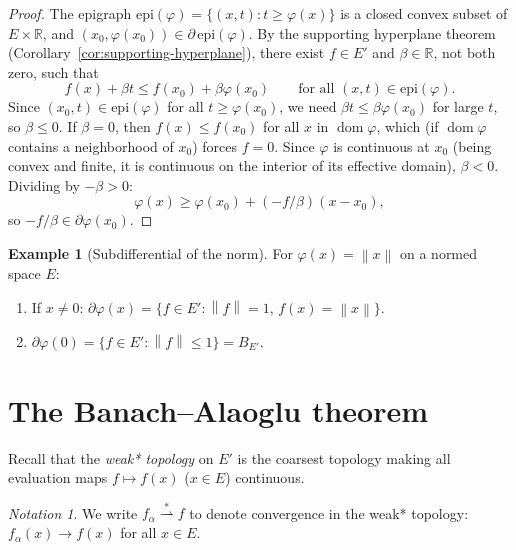\documentclass[a4paper,12pt]{book}
\DeclareMathOperator{\dom}{dom}
\newcommand{\R}{\mathbb{R}}
\newcommand{\norm}[1]{\left\| #1 \right\|}
\newcommand{\weakstarto}{\overset{*}{\rightharpoonup}}
\theoremstyle{definition}
\newtheorem{example}[definition]{Example}
\theoremstyle{plain}
\theoremstyle{remark}
\newtheorem{notation}[definition]{Notation}
\begin{document}
\begin{proof}
The epigraph $\mathrm{epi}(\varphi)=\{(x,t):t\geq\varphi(x)\}$
is a closed convex subset of $E\times\R$, and $(x_0,\varphi(x_0))\in\partial\,\mathrm{epi}(\varphi)$.
By the supporting hyperplane theorem (Corollary~\ref{cor:supporting-hyperplane}),
there exist $f\in E'$ and $\beta\in\R$, not both zero, such that
\[
  f(x)+\beta t \leq f(x_0)+\beta\varphi(x_0)
  \qquad\text{for all } (x,t)\in\mathrm{epi}(\varphi).
\]
Since $(x_0,t)\in\mathrm{epi}(\varphi)$ for all $t\geq\varphi(x_0)$, we need
$\beta t\leq\beta\varphi(x_0)$ for large $t$, so $\beta\leq 0$. If $\beta=0$,
then $f(x)\leq f(x_0)$ for all $x$ in $\dom\varphi$, which (if $\dom\varphi$
contains a neighborhood of $x_0$) forces $f=0$. Since $\varphi$ is continuous
at $x_0$ (being convex and finite, it is continuous on the interior of its
effective domain), $\beta<0$. Dividing by $-\beta>0$:
\[
  \varphi(x) \geq \varphi(x_0) + (-f/\beta)(x-x_0),
\]
so $-f/\beta\in\partial\varphi(x_0)$.
\end{proof}

\begin{example}[Subdifferential of the norm]\label{ex:subdiff-norm}
For $\varphi(x)=\norm{x}$ on a normed space $E$:
\begin{enumerate}[label=(\roman*)]
  \item If $x\neq 0$: $\partial\varphi(x) = \{f\in E':\norm{f}=1,\, f(x)=\norm{x}\}$.
  \item $\partial\varphi(0) = \{f\in E':\norm{f}\leq 1\} = B_{E'}$.
\end{enumerate}
\end{example}

\section{The Banach--Alaoglu theorem}\label{sec:banach-alaoglu}

Recall that the \emph{weak* topology} on $E'$ is the
coarsest topology making all evaluation maps $f\mapsto f(x)$ ($x\in E$)
continuous.

\begin{notation}\label{not:weak-star}
We write $f_\alpha\weakstarto f$ to denote convergence in the weak* topology:
$f_\alpha(x)\to f(x)$ for all $x\in E$.
\end{notation}
\end{document}
